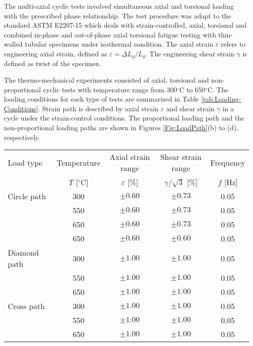 \documentclass[preprint,5p,twocolumn,11pt,sort&compress]{elsarticle}
\begin{document}
The multi-axial cyclic tests involved simultaneous axial and torsional loading with the prescribed phase relationship.
The test procedure was adapt to the standard ASTM E2207-15 which deals with strain-controlled, axial, torsional and combined in-phase and out-of-phase axial torsional fatigue testing with thin-walled tubular specimens under isothermal condition.
The axial strain $\varepsilon$ refers to engineering axial strain, defined as $\varepsilon=\Delta L_g/L_g$. The engineering shear strain $\gamma$ is defined as twist of the specimen.

The thermo-mechanical experiments consisted of axial, torsional and non-proportional cyclic tests with temperature range from 300$^{\circ}$C to 650$^{\circ}$C. The loading conditions for each type of tests are summarized in Table \ref{tab:Loading-Conditions}.
Strain path is described by axial strain $\varepsilon$ and shear strain $\gamma$ in a cycle under the  strain-control conditions. The proportional loading path and the non-proportional loading paths are shown in Figures \ref{Fig:LoadPath}(b) to (d), respectively.

\begin{table*}[htbp]
  \centering
  \caption{Temperature and loading conditions of the isothermal test program.}
    \begin{tabular}{lcccc}
    \hline
    Load type & Temperature & Axial strain range  & Shear strain range & Frequency\\
              & $T$ [$^{\circ}$C] & $\varepsilon$ [\%]& $\gamma /\sqrt 3$ [\%] & $f$ [Hz]  \\
    \hline
    Circle path & 300 & $\pm0.60$ & $\pm0.73$ & 0.05 \\
                & 550 & $\pm0.60$ & $\pm0.73$ & 0.05 \\
                & 650 & $\pm0.60$ & $\pm0.73$ & 0.05 \\
                & 650 & $\pm0.60$ & $\pm0.60$ & 0.05 \\
    \hline
    Diamond path & 300 & $\pm1.00$ & $\pm1.00$ & 0.05 \\
                 & 550 & $\pm1.00$ & $\pm1.00$ & 0.05 \\
                 & 650 & $\pm1.00$ & $\pm1.00$ & 0.05 \\
    \hline
    Cross path   & 300 & $\pm1.00$ & $\pm1.00$ & 0.05 \\
                 & 550 & $\pm1.00$ & $\pm1.00$ & 0.05 \\
                 & 650 & $\pm1.00$ & $\pm1.00$ & 0.05 \\
    \hline
    \end{tabular}%
  \label{tab:Loading-Conditions}%
\end{table*}%
\end{document}
